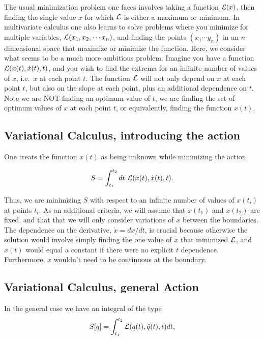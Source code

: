 \documentclass[%
oneside,                 %
final,                   %
10pt]{article}
\begin{document}
The usual minimization problem one faces involves taking a function
${\cal L}(x)$, then finding the single value $x$ for which ${\cal L}$
is either a maximum or minimum. In multivariate calculus one also
learns to solve problems where you minimize for multiple variables,
${\cal L}(x_1,x_2,\cdots x_n)$, and finding the points $(x_1\cdots
y_n)$ in an $n$-dimensional space that maximize or minimize the
function. Here, we consider what seems to be a much more ambitious
problem. Imagine you have a function ${\cal L}(x(t),\dot{x}(t),t)$,
and you wish to find the extrema for an infinite number of values of
$x$, i.e.~$x$ at each point $t$. The function ${\cal L}$ will not only
depend on $x$ at each point $t$, but also on the slope at each point,
plus an additional dependence on $t$. Note we are NOT finding an
optimum value of $t$, we are finding the set of optimum values of $x$
at each point $t$, or equivalently, finding the function $x(t)$.

\subsection{Variational Calculus, introducing the action}

One treats the function $x(t)$ as being unknown while minimizing the action

\[
S=\int_{t_1}^{t_2}dt~{\cal L}(x(t),\dot{x}(t),t).
\]

Thus, we are minimizing $S$ with respect to an infinite number of
values of $x(t_i)$ at points $t_i$. As an additional criteria, we will
assume that $x(t_1)$ and $x(t_2)$ are fixed, and that that we will
only consider variations of $x$ between the boundaries. The dependence
on the derivative, $\dot{x}=dx/dt$, is crucial because otherwise the
solution would involve simply finding the one value of $x$ that
minimized ${\cal L}$, and $x(t)$ would equal a constant if there were no
explicit $t$ dependence. Furthermore, $x$ wouldn't need to be
continuous at the boundary.

\subsection{Variational Calculus, general Action}

In the general case we have an integral of the type
\[ 
S[q]= \int_{t_1}^{t_2} {\cal L}(q(t),\dot{q}(t),t)dt,
\]
\end{document}
